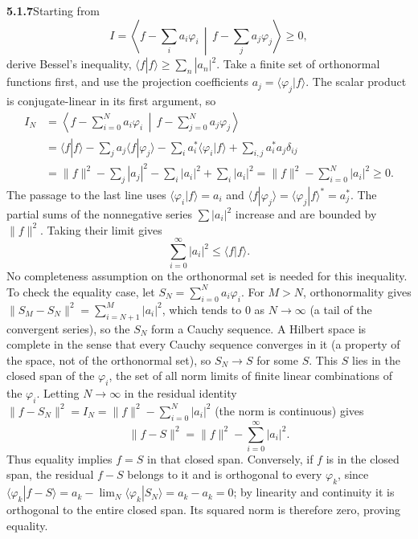\par\bigskip
\noindent\textbf{5.1.7}\quad Starting from
\[
I=\left\langle f-\sum_{i}a_{i}\varphi_{i}\,\middle|\,
f-\sum_{j}a_{j}\varphi_{j}\right\rangle\ge0,
\]
derive Bessel's inequality,
$\langle f|f\rangle\ge\sum_{n}|a_{n}|^{2}$.
\solution
{}
Take a finite set of orthonormal functions first, and use the projection
coefficients $a_j=\langle\varphi_j|f\rangle$. The scalar product is
conjugate-linear in its first argument, so
\begin{align*}
I_N&=\left\langle f-\sum_{i=0}^Na_i\varphi_i\,\middle|\,
 f-\sum_{j=0}^Na_j\varphi_j\right\rangle\\
&=\langle f|f\rangle
 -\sum_j a_j\langle f|\varphi_j\rangle
 -\sum_i a_i^*\langle\varphi_i|f\rangle
 +\sum_{i,j}a_i^*a_j\delta_{ij}\\
&=\|f\|^2-\sum_j|a_j|^2-\sum_i|a_i|^2
 +\sum_i|a_i|^2
=\|f\|^2-\sum_{i=0}^N|a_i|^2\ge0.
\end{align*}
The passage to the last line uses $\langle\varphi_i|f\rangle=a_i$ and
$\langle f|\varphi_j\rangle=\langle\varphi_j|f\rangle^*=a_j^*$.
The partial sums of the nonnegative series $\sum|a_i|^2$ increase and
are bounded by $\|f\|^2$. Taking their limit gives
\[
\boxed{\sum_{i=0}^\infty|a_i|^2\le\langle f|f\rangle}.
\]
No completeness assumption on the orthonormal set is needed for this
inequality. To check the equality case, let $S_N=\sum_{i=0}^Na_i\varphi_i$.
For $M>N$, orthonormality gives
$\|S_M-S_N\|^2=\sum_{i=N+1}^M|a_i|^2$, which tends to $0$ as $N\to\infty$
(a tail of the convergent series), so the $S_N$ form a Cauchy sequence.
A Hilbert space is complete in the sense that every Cauchy sequence
converges in it (a property of the space, not of the orthonormal set), so
$S_N\to S$ for some $S$. This $S$ lies in the closed span of the
$\varphi_i$, the set of all norm limits of finite linear combinations of
the $\varphi_i$.
Letting $N\to\infty$ in the residual identity
$\|f-S_N\|^2=I_N=\|f\|^2-\sum_{i=0}^N|a_i|^2$ (the norm is continuous) gives
\[
\|f-S\|^2=\|f\|^2-\sum_{i=0}^\infty|a_i|^2.
\]
Thus equality implies $f=S$ in that closed span. Conversely, if $f$ is in
the closed span, the residual $f-S$ belongs to it and is orthogonal to
every $\varphi_k$, since
$\langle\varphi_k|f-S\rangle=a_k-\lim_N\langle\varphi_k|S_N\rangle=a_k-a_k=0$;
by linearity and continuity it is orthogonal to the entire closed span.
Its squared norm is therefore zero, proving equality.

